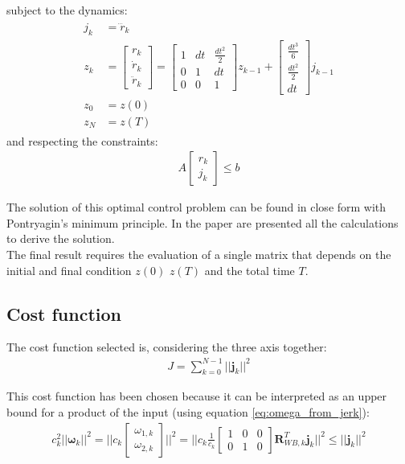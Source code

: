 subject to the dynamics:
\begin{align}
\begin{split}
j_k &= \dddot{r}_k\\[10pt]
z_k  &= 
{\begin{bmatrix}
 r_k \\[5pt]
 \dot{r}_k \\[5pt]
 \ddot{r}_k
\end{bmatrix}} = 
{\begin{bmatrix}
1 & dt & \frac{dt^2}{2}  \\[5pt]
0 & 1 & dt \\[5pt]
0 & 0 & 1
\end{bmatrix}}z_{k-1} + 
{\begin{bmatrix}
 \frac{dt^3}{6}  \\[5pt]
 \frac{dt^2}{2} \\[5pt]
 dt
\end{bmatrix}}j_{k-1} \\[10pt]
z_0 &= z(0) \\[5pt]
z_N &= z(T)
\end{split}
\end{align}
and respecting the constraints:
\begin{align}
A
{\begin{bmatrix}
 r_k \\[10pt]
j_k
\end{bmatrix}} \leq b
\end{align}

The solution of this optimal control problem can be found in close form with Pontryagin's minimum principle.
In the paper \cite{mueller2015computationally} are presented all the calculations to derive the solution.\\
The final result requires the evaluation of a single matrix that depends on the initial and final condition $z(0)$ $z(T)$ and the total time $T$.

\subsection{Cost function}
The cost function selected is, considering the three axis together:
\begin{align}
J = \sum_{k=0}^{N-1} ||\boldsymbol{j}_k||^2
\end{align}

This cost function has been chosen because it can be interpreted as an upper bound for a product of the input (using equation \ref{eq:omega_from_jerk}):
\begin{align}
c_k^2||\boldsymbol{\omega}_k||^2 = \Big|\Big| c_k
\begin{bmatrix}
\omega_{1,k} \\[2pt]
\omega_{2,k}
\end{bmatrix}\Big|\Big|^2 = \Big|\Big| c_k \frac{1}{c_k}
{\begin{bmatrix}
1 & 0 & 0  \\[2pt]
0 & 1 & 0
\end{bmatrix}}\boldsymbol{R}_{WB,k}^T \boldsymbol{j}_k\Big|\Big|^2 \leq ||\boldsymbol{j}_k||^2
\end{align}

